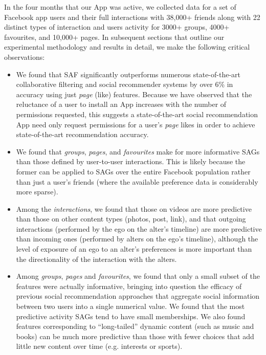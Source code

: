 In the four months that our App was active, we collected data for a
set of Facebook app users and their full interactions with 38,000+
friends along with 22 distinct types of interaction and users activity
for 3000+ groups, 4000+ favourites, and 10,000+ pages.  In subsequent
sections that outline our experimental methodology and results in
detail, we make the following critical observations:
\begin{itemize}
\item We found that SAF significantly 
outperforms numerous state-of-the-art collaborative filtering and social recommender 
systems by over 6\% in accuracy using just \emph{page} (like) features.
Because we have observed that the reluctance of a user to install an App increases with the number
of permissions requested, this suggests a state-of-the-art social recommendation App 
need only request permissions for a user's \emph{page} likes in order to achieve
state-of-the-art recommendation accuracy.
\item We found that \emph{groups}, \emph{pages}, and \emph{favourites} make for more informative
SAGs than those defined by user-to-user interactions.  This is likely because the former can be
applied to SAGs over the entire Facebook population 
rather than just a user's friends (where the available preference data is considerably more sparse).
\item Among the \emph{interactions}, we found that those on videos are more predictive than those on other content types (photos, post, link), and that outgoing interactions (performed by the ego on the alter's timeline) 
are more predictive than incoming ones (performed by alters on the
ego's timeline), although the level of exposure of an ego to an
alter's preferences is more important than the directionality of the
interaction with the alters.
\item %
Among {\em groups}, {\em pages} and {\em favourites}, we found that only
a small subset of the features were actually informative, bringing into question the efficacy of 
previous social recommendation approaches that aggregate social information between
two users into a single numerical value.  We found that the most  
predictive activity SAGs tend to have small memberships.  We also found features
corresponding to ``long-tailed'' dynamic content (such as music and books)
can be much more predictive than those with fewer choices that 
add little new content over time (e.g. interests or sports). 
\end{itemize}
